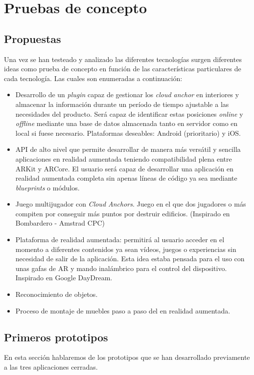 \chapter{Pruebas de concepto}
\section{Propuestas}
Una vez se han testeado y analizado las diferentes tecnologías surgen diferentes ideas como prueba de concepto en función de las características particulares de cada tecnología. Las cuales son enumeradas a continuación:

\begin{itemize}
\item Desarrollo de un \textit{plugin} capaz de gestionar los \textit{cloud anchor} en interiores y almacenar la información durante un período de tiempo ajustable a las necesidades del producto. Será capaz de identificar estas posiciones \textit{online} y \textit{offline} mediante una base de datos almacenada tanto en servidor como en local si fuese necesario. Plataformas deseables: Android (prioritario) y iOS. 
\item API de alto nivel que permite desarrollar de manera más versátil y sencilla aplicaciones en realidad aumentada teniendo compatibilidad plena entre ARKit y ARCore. El usuario será capaz de desarrollar una aplicación en realidad aumentada completa sin apenas líneas de código ya sea mediante \textit{blueprints} o módulos.
\item Juego multijugador con \textit{Cloud Anchors}. Juego en el que dos jugadores o más compiten por conseguir más puntos por destruir edificios. (Inspirado en Bombardero - Amstrad CPC)
\item Plataforma de realidad aumentada: permitirá al usuario acceder en el momento a diferentes contenidos ya sean vídeos, juegos o experiencias sin necesidad de salir de la aplicación. Esta idea estaba pensada para el uso con unas gafas de AR y mando inalámbrico para el control del dispositivo. Inspirado en Google DayDream.
\item Reconocimiento de objetos.
\item Proceso de montaje de muebles paso a paso del en realidad aumentada.
\end{itemize}

\clearpage
\section{Primeros prototipos}
En esta sección hablaremos de los prototipos que se han desarrollado previamente a las tres aplicaciones cerradas.

